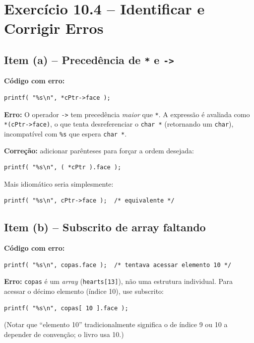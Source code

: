 \documentclass[12pt,a4paper]{article}
\begin{document}
\newpage

\section{Exercício 10.4 -- Identificar e Corrigir Erros}

\subsection*{Item (a) -- Precedência de \texttt{*} e \texttt{->}}
\begin{respostabox}
\textbf{Código com erro:}
\begin{lstlisting}
printf( "%s\n", *cPtr->face );
\end{lstlisting}

\textbf{Erro:} O operador \texttt{->} tem precedência \textit{maior} que \texttt{*}.
A expressão é avaliada como \texttt{*(cPtr->face)}, o que tenta desreferenciar o
\texttt{char *} (retornando um \texttt{char}), incompatível com \texttt{\%s} que
espera \texttt{char *}.

\textbf{Correção:} adicionar parênteses para forçar a ordem desejada:
\begin{lstlisting}
printf( "%s\n", ( *cPtr ).face );
\end{lstlisting}
Mais idiomático seria simplesmente:
\begin{lstlisting}
printf( "%s\n", cPtr->face );  /* equivalente */
\end{lstlisting}
\end{respostabox}

\subsection*{Item (b) -- Subscrito de array faltando}
\begin{respostabox}
\textbf{Código com erro:}
\begin{lstlisting}
printf( "%s\n", copas.face );  /* tentava acessar elemento 10 */
\end{lstlisting}

\textbf{Erro:} \texttt{copas} é um \textit{array} (\texttt{hearts[13]}), não uma
estrutura individual. Para acessar o décimo elemento (índice 10), use subscrito:
\begin{lstlisting}
printf( "%s\n", copas[ 10 ].face );
\end{lstlisting}
(Notar que ``elemento 10'' tradicionalmente significa o de índice 9 ou 10 a depender
de convenção; o livro usa 10.)
\end{respostabox}
\end{document}
